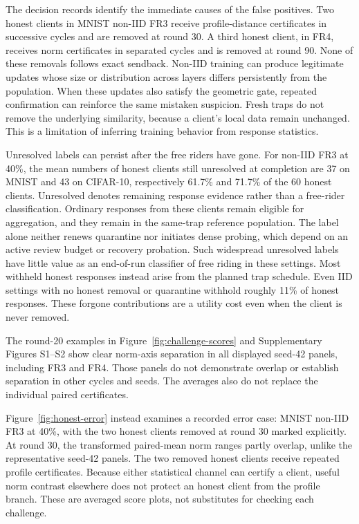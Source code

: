 \documentclass[journal]{IEEEtran}
\makeatletter
\renewcommand{\subsection}{\@startsection{subsection}{2}{\z@}{1.5ex}{0.7ex}{\normalfont\normalsize\itshape}}
\makeatother
\begin{document}
The decision records identify the immediate causes of the false positives.
Two honest clients in MNIST non-IID FR3 receive profile-distance
certificates in successive cycles and are removed at round 30. A third
honest client, in FR4, receives norm certificates in separated cycles
and is removed at round 90. None of these removals follows exact sendback.
Non-IID training can produce legitimate updates whose size or distribution
across layers differs persistently from the population. When these updates
also satisfy the geometric gate, repeated confirmation can reinforce the
same mistaken suspicion. Fresh traps do not remove the underlying
similarity, because a client's local data remain unchanged. This is a
limitation of inferring training behavior from response statistics.

Unresolved labels can persist after the free riders have gone.
For non-IID FR3 at 40\%, the mean numbers of honest clients still
unresolved at completion are 37 on MNIST and 43 on CIFAR-10, respectively
61.7\% and 71.7\% of the 60 honest clients. Unresolved denotes remaining
response evidence rather than a free-rider classification.
Ordinary responses from these clients remain
eligible for aggregation, and they remain in the same-trap reference
population. The label alone neither renews quarantine nor initiates dense
probing, which depend on an active review budget or recovery probation.
Such widespread unresolved labels have little value as an end-of-run
classifier of free riding in these settings.
Most withheld honest responses instead arise from the planned trap
schedule. Even IID settings with no honest removal or quarantine withhold
roughly 11\% of honest responses. These forgone contributions are a
utility cost even when the client is never removed.


\subsection{What the Score Plots Establish}
The round-20 examples in Figure~\ref{fig:challenge-scores} and
Supplementary Figures S1--S2 show clear norm-axis separation in all
displayed seed-42 panels, including FR3 and FR4. Those panels do not
demonstrate overlap or establish separation in other cycles and seeds.
The averages also do not replace the individual paired certificates.

Figure~\ref{fig:honest-error} instead examines a recorded error case:
MNIST non-IID FR3 at 40\%, with the two honest clients removed at round 30
marked explicitly. At round 30, the transformed paired-mean norm ranges
partly overlap, unlike the representative seed-42 panels. The two removed
honest clients receive repeated profile certificates. Because either
statistical channel can certify a client, useful norm contrast elsewhere
does not protect an honest client from the profile branch. These are
averaged score plots, not substitutes for checking each challenge.

\end{document}

